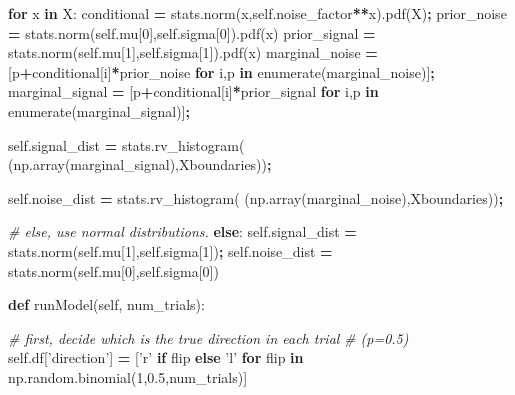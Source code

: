 \documentclass[12pt,twoside]{reedthesis}
\newenvironment{Shaded}{\begin{snugshade}}{\end{snugshade}}
\newcommand{\BuiltInTok}[1]{#1}
\newcommand{\CommentTok}[1]{\textcolor[rgb]{0.56,0.35,0.01}{\textit{#1}}}
\newcommand{\ControlFlowTok}[1]{\textcolor[rgb]{0.13,0.29,0.53}{\textbf{#1}}}
\newcommand{\DecValTok}[1]{\textcolor[rgb]{0.00,0.00,0.81}{#1}}
\newcommand{\FloatTok}[1]{\textcolor[rgb]{0.00,0.00,0.81}{#1}}
\newcommand{\KeywordTok}[1]{\textcolor[rgb]{0.13,0.29,0.53}{\textbf{#1}}}
\newcommand{\NormalTok}[1]{#1}
\newcommand{\OperatorTok}[1]{\textcolor[rgb]{0.81,0.36,0.00}{\textbf{#1}}}
\newcommand{\StringTok}[1]{\textcolor[rgb]{0.31,0.60,0.02}{#1}}
\newcommand{\VariableTok}[1]{\textcolor[rgb]{0.00,0.00,0.00}{#1}}
\begin{document}
\begin{Shaded}
\begin{Highlighting}[]
          \ControlFlowTok{for}\NormalTok{ x }\KeywordTok{in}\NormalTok{ X:}
\NormalTok{            conditional }\OperatorTok{=}\NormalTok{ stats.norm(x,}\VariableTok{self}\NormalTok{.noise_factor}\OperatorTok{**}\NormalTok{x).pdf(X)}\OperatorTok{;}
\NormalTok{            prior_noise }\OperatorTok{=}\NormalTok{ stats.norm(}\VariableTok{self}\NormalTok{.mu[}\DecValTok{0}\NormalTok{],}\VariableTok{self}\NormalTok{.sigma[}\DecValTok{0}\NormalTok{]).pdf(x)}
\NormalTok{            prior_signal }\OperatorTok{=}\NormalTok{ stats.norm(}\VariableTok{self}\NormalTok{.mu[}\DecValTok{1}\NormalTok{],}\VariableTok{self}\NormalTok{.sigma[}\DecValTok{1}\NormalTok{]).pdf(x)}
\NormalTok{            marginal_noise }\OperatorTok{=}\NormalTok{ [p}\OperatorTok{+}\NormalTok{conditional[i]}\OperatorTok{*}\NormalTok{prior_noise }
                              \ControlFlowTok{for}\NormalTok{ i,p }\KeywordTok{in} \BuiltInTok{enumerate}\NormalTok{(marginal_noise)]}\OperatorTok{;}
\NormalTok{            marginal_signal }\OperatorTok{=}\NormalTok{ [p}\OperatorTok{+}\NormalTok{conditional[i]}\OperatorTok{*}\NormalTok{prior_signal }
                               \ControlFlowTok{for}\NormalTok{ i,p }\KeywordTok{in} \BuiltInTok{enumerate}\NormalTok{(marginal_signal)]}\OperatorTok{;}

          
          \VariableTok{self}\NormalTok{.signal_dist }\OperatorTok{=}\NormalTok{ stats.rv_histogram(}
\NormalTok{              (np.array(marginal_signal),Xboundaries))}\OperatorTok{;}

          \VariableTok{self}\NormalTok{.noise_dist }\OperatorTok{=}\NormalTok{ stats.rv_histogram(}
\NormalTok{              (np.array(marginal_noise),Xboundaries))}\OperatorTok{;}

        \CommentTok{# else, use normal distributions.}
        \ControlFlowTok{else}\NormalTok{:}
          \VariableTok{self}\NormalTok{.signal_dist }\OperatorTok{=}\NormalTok{ stats.norm(}\VariableTok{self}\NormalTok{.mu[}\DecValTok{1}\NormalTok{],}\VariableTok{self}\NormalTok{.sigma[}\DecValTok{1}\NormalTok{])}\OperatorTok{;}
          \VariableTok{self}\NormalTok{.noise_dist }\OperatorTok{=}\NormalTok{ stats.norm(}\VariableTok{self}\NormalTok{.mu[}\DecValTok{0}\NormalTok{],}\VariableTok{self}\NormalTok{.sigma[}\DecValTok{0}\NormalTok{])}
      
    \KeywordTok{def}\NormalTok{ runModel(}\VariableTok{self}\NormalTok{, num_trials):}

        \CommentTok{# first, decide which is the true direction in each trial}
        \CommentTok{# (p=0.5)}
        \VariableTok{self}\NormalTok{.df[}\StringTok{'direction'}\NormalTok{] }\OperatorTok{=}\NormalTok{ [}\StringTok{'r'} \ControlFlowTok{if}\NormalTok{ flip }\ControlFlowTok{else} \StringTok{'l'} 
               \ControlFlowTok{for}\NormalTok{ flip }\KeywordTok{in}\NormalTok{ np.random.binomial(}\DecValTok{1}\NormalTok{,}\FloatTok{0.5}\NormalTok{,num_trials)] }


\end{Highlighting}
\end{Shaded}
\end{document}
